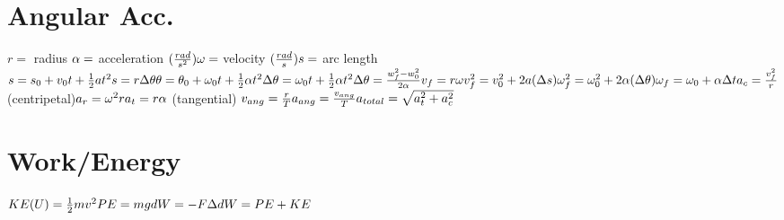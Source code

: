 \documentclass[11pt]{article}
\begin{document}
\begin{paracol}{3}
        \section*{Angular Acc.}
        \begin{fleqn}
            $
            r = $ radius $ \newline
            \alpha = $ acceleration $ (\frac{rad}{s^2}) \newline
            \omega = $ velocity $ (\frac{rad}{s}) \newline
            s = $ arc length $ \newline
            s=s_0 + v_0t + \frac{1}{2}at^2 \newline
            s = r \Delta \theta \newline
            \theta = \theta_0 + \omega_0 t + \frac{1}{2}\alpha t^2  \newline
            \Delta \theta = \omega_0 t + \frac{1}{2}\alpha t^2  \newline
            \Delta \theta = \frac{w^2_f - w^2_0}{2 \alpha} \newline
            v_f = r\omega \newline
            v^2_f = v_0^2+2a(\Delta s)  \newline
            \omega^2_f = \omega_0 ^2 + 2 \alpha (\Delta \theta) \newline
            \omega_f = \omega_0 + \alpha \Delta t  \newline
            a_c = \frac{v^2_f}{r} $ (centripetal)$\newline
            a_r = \omega^{2}r \newline
            a_t = r \alpha $ (tangential) $ \newline
            v_{ang} = \frac{r}{T} \newline
            a_{ang} = \frac{v_{ang}}{T} \newline
            a_{total} = \sqrt{a_t^2+a_c^2}
            $
        \end{fleqn}
        \section*{Work/Energy}
        \begin{fleqn}
            $
            KE (U) = \frac{1}{2}mv^2 \newline
            PE = mgd
            W = -F\Delta d
            W=PE+KE
            $
        \end{fleqn}
        \switchcolumn

\end{paracol}
\end{document}
